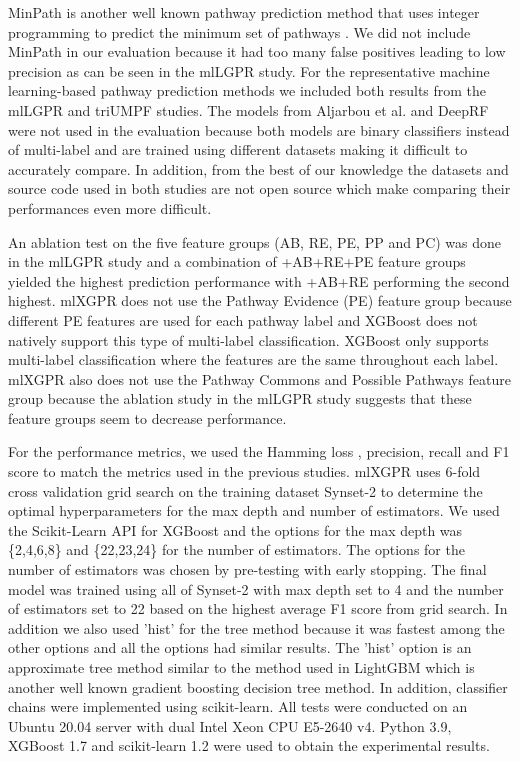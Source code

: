 \documentclass[sn-mathphys,Numbered]{sn-jnl}%
\theoremstyle{thmstyleone}%
\theoremstyle{thmstyletwo}%
\theoremstyle{thmstylethree}%
\begin{document}
MinPath is another well known pathway prediction method that uses integer programming to predict the minimum set of pathways \cite{yeParsimonyApproachBiological2009}.
We did not include MinPath in our evaluation because it had too many false positives leading to low precision as can be seen in the mlLGPR study.
For the representative machine learning-based pathway prediction methods we included both results from the mlLGPR and triUMPF \cite{basherMetabolicPathwayPrediction2021} studies.
The models from Aljarbou et al. \cite{aljarbouDeterminingPresenceMetabolic2020} and DeepRF \cite{shahDeepRFDeepLearning2022} were not used in the evaluation because both models are binary classifiers instead of multi-label and are trained using different datasets making it difficult to accurately compare.
In addition, from the best of our knowledge the datasets and source code used in both studies are not open source which make comparing their performances even more difficult.

An ablation test on the five feature groups (AB, RE, PE, PP and PC) was done in the mlLGPR study and a combination of +AB+RE+PE feature groups yielded the highest prediction performance with +AB+RE performing the second highest. 
mlXGPR does not use the Pathway Evidence (PE) feature group because different PE features are used for each pathway label and XGBoost does not natively support this type of multi-label classification. 
XGBoost only supports multi-label classification where the features are the same throughout each label.
mlXGPR also does not use the Pathway Commons and Possible Pathways feature group because the ablation study in the mlLGPR study suggests that these feature groups seem to decrease performance.

For the performance metrics, we used the Hamming loss \cite{pmlr-v70-wu17a}, precision, recall and F1 score to match the metrics used in the previous studies.
mlXGPR uses 6-fold cross validation grid search on the training dataset Synset-2 to determine the optimal hyperparameters for the max depth and number of estimators. 
We used the Scikit-Learn API for XGBoost and the options for the max depth was \{2,4,6,8\} and \{22,23,24\} for the number of estimators. 
The options for the number of estimators was chosen by pre-testing with early stopping.
The final model was trained using all of Synset-2 with max depth set to 4 and the number of estimators set to 22 based on the highest average F1 score from grid search.
In addition we also used 'hist' for the tree method because it was fastest among the other options and all the options had similar results.
The 'hist' option is an approximate tree method similar to the method used in LightGBM \cite{10.5555/3294996.3295074} which is another well known gradient boosting decision tree method.
In addition, classifier chains were implemented using scikit-learn.
All tests were conducted on an Ubuntu 20.04 server with dual Intel Xeon CPU E5-2640 v4.
Python 3.9, XGBoost 1.7 and scikit-learn 1.2 were used to obtain the experimental results.
\end{document}
